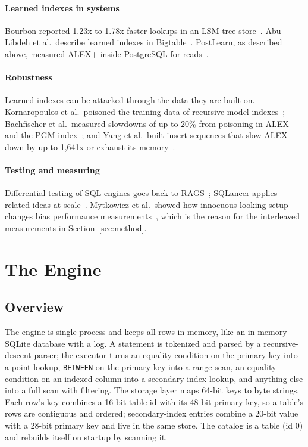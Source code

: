 \documentclass[conference]{IEEEtran}
\begin{document}
\paragraph{Learned indexes in systems} Bourbon reported 1.23x to 1.78x
faster lookups in an LSM-tree store~\cite{dai2020}. Abu-Libdeh et al.\
describe learned indexes in Bigtable~\cite{abulibdeh2020}. PostLearn, as
described above, measured ALEX+ inside PostgreSQL for reads~\cite{fuad2026}.

\paragraph{Robustness} Learned indexes can be attacked through the data
they are built on. Kornaropoulos et al.\ poisoned the training data of
recursive model indexes~\cite{kornaropoulos2022}; Bachfischer et al.\
measured slowdowns of up to 20\% from poisoning in ALEX and the
PGM-index~\cite{bachfischer2022}; and Yang et al.\ built insert sequences
that slow ALEX down by up to 1,641x or exhaust its memory~\cite{yang2024}.

\paragraph{Testing and measuring} Differential testing of SQL engines goes
back to RAGS~\cite{slutz1998}; SQLancer applies related ideas at
scale~\cite{rigger2020}. Mytkowicz et al.\ showed how innocuous-looking
setup changes bias performance measurements~\cite{mytkowicz2009}, which is
the reason for the interleaved measurements in Section~\ref{sec:method}.

\section{The Engine}
\label{sec:system}

\subsection{Overview}

The engine is single-process and keeps all rows in memory, like an
in-memory SQLite database with a log. A statement is tokenized and parsed
by a recursive-descent parser; the executor turns an equality condition on
the primary key into a point lookup, \texttt{BETWEEN} on the primary key
into a range scan, an equality condition on an indexed column into a
secondary-index lookup, and anything else into a full scan with filtering.
The storage layer maps 64-bit keys to byte strings. Each row's key combines
a 16-bit table id with its 48-bit primary key, so a table's rows are
contiguous and ordered; secondary-index entries combine a 20-bit value with
a 28-bit primary key and live in the same store. The catalog is a table
(id 0) and rebuilds itself on startup by scanning it.
\end{document}
